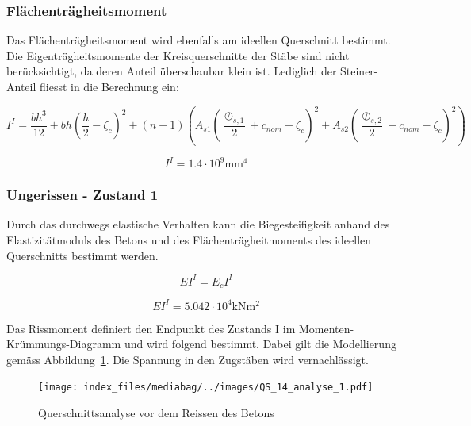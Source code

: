 \documentclass[
  12pt,
  letterpaper,
  egregdoesnotlikesansseriftitles]{scrreprt}
\begin{document}
\hypertarget{fluxe4chentruxe4gheitsmoment-1}{%
\subsubsection{Flächenträgheitsmoment}\label{fluxe4chentruxe4gheitsmoment-1}}

Das Flächenträgheitsmoment wird ebenfalls am ideellen Querschnitt
bestimmt. Die Eigenträgheitsmomente der Kreisquerschnitte der Stäbe sind
nicht berücksichtigt, da deren Anteil überschaubar klein ist. Lediglich
der Steiner-Anteil fliesst in die Berechnung ein:

\begin{equation}I^{I} = \frac{b h^{3}}{12} + b h \left(\frac{h}{2} - \zeta_{c}\right)^{2} + \left(n - 1\right) \left(A_{s 1} \left(\frac{\oslash_{s,1}}{2} + c_{nom} - \zeta_{c}\right)^{2} + A_{s 2} \left(\frac{\oslash_{s,2}}{2} + c_{nom} - \zeta_{c}\right)^{2}\right)\end{equation}

\begin{equation}I^{I} = 1.4 \cdot 10^{9} \text{mm}^{4}\end{equation}

\hypertarget{ungerissen---zustand-1-1}{%
\subsubsection{Ungerissen - Zustand 1}\label{ungerissen---zustand-1-1}}

Durch das durchwegs elastische Verhalten kann die Biegesteifigkeit
anhand des Elastizitätmoduls des Betons und des Flächenträgheitmoments
des ideellen Querschnitts bestimmt werden.

\begin{equation}EI^{I} = E_{c} I^{I}\end{equation}

\begin{equation}EI^{I} = 5.042 \cdot 10^{4} \text{kN} \text{m}^{2}\end{equation}

Das Rissmoment definiert den Endpunkt des Zustands I im
Momenten-Krümmungs-Diagramm und wird folgend bestimmt. Dabei gilt die
Modellierung gemäss Abbildung~\ref{fig-qs2_sv14}. Die Spannung in den
Zugstäben wird vernachlässigt.

\begin{figure}[H]

{\centering \texttt{[image: index\_files/mediabag/../images/QS\_14\_analyse\_1.pdf]}

}

\caption{\label{fig-qs2_sv14}Querschnittsanalyse vor dem Reissen des
Betons}

\end{figure}
\end{document}
